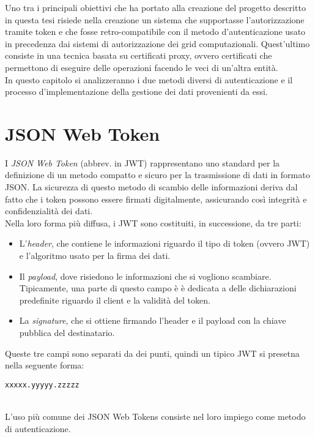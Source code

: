 Uno tra i principali obiettivi che ha portato alla creazione del progetto descritto in questa tesi 
risiede nella creazione un sistema che supportasse 
l'autorizzazione tramite token e che fosse retro-compatibile con il metodo d'autenticazione usato in precedenza dai sistemi di autorizzazione dei grid computazionali.  
Quest'ultimo consiste in una tecnica basata su certificati proxy, ovvero certificati che permettono di eseguire delle operazioni facendo le veci di un'altra entità. 
\\ In questo capitolo si analizzeranno i due metodi diversi di autenticazione e il processo d'implementazione della gestione 
dei dati provenienti da essi.

\section{JSON Web Token}
I \textit{JSON Web Token} (abbrev. in JWT) rappresentano uno standard per la definizione di un metodo 
compatto e sicuro per la trasmissione di dati in formato JSON. La sicurezza di questo metodo di scambio delle 
informazioni deriva dal fatto che i token possono essere firmati digitalmente, assicurando così integrità e confidenzialità dei dati.  
\\ Nella loro forma più diffusa, i JWT sono costituiti, in successione, da tre parti:
\begin{itemize}
    \item L'\textit{header}, che contiene le informazioni riguardo il tipo di token (ovvero JWT) e 
    l'algoritmo usato per la firma dei dati. 
    \item Il \textit{payload}, dove risiedono le informazioni che si vogliono scambiare. Tipicamente, una parte di questo campo è 
    è dedicata a delle dichiarazioni predefinite riguardo il client e la validità del token. 
    \item La \textit{signature}, che si ottiene firmando l'header e il payload con la chiave pubblica del destinatario.
\end{itemize}
Queste tre campi sono separati da dei punti, quindi un tipico JWT si presetna nella seguente forma:
\\ \centerline{\texttt{xxxxx.yyyyy.zzzzz}}
\\ L'uso più comune dei JSON Web Tokens consiste nel loro impiego come metodo di autenticazione.

